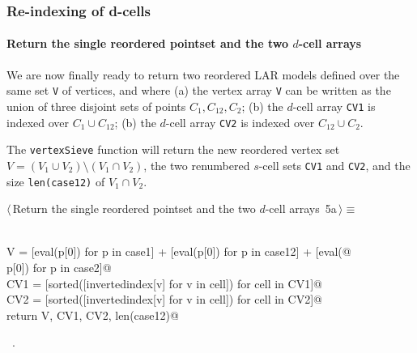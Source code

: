 \documentclass[11pt,oneside]{article}	%
\begin{document}
\subsubsection{Re-indexing of d-cells}

\paragraph{Return the single reordered pointset and the two $d$-cell arrays}
We are now finally ready to return two reordered LAR models defined over the same set \texttt{V} of vertices, and where (a) the vertex array \texttt{V} can be written as the union of three disjoint sets of points $C_1,C_{12},C_2$; (b) the $d$-cell array \texttt{CV1} is indexed over $C_1\cup C_{12}$; (b) the $d$-cell array \texttt{CV2} is indexed over $C_{12}\cup C_{2}$. 

The \texttt{vertexSieve} function will return the new reordered vertex set $V = (V_1 \cup V_2) \setminus (V_1 \cap V_2)$, the two renumbered $s$-cell sets \texttt{CV1} and \texttt{CV2}, and the size \texttt{len(case12)} of $V_1 \cap V_2$.
\begin{flushleft} \small \label{scrap7}
\protect{}$\langle\,$Return the single reordered pointset and the two $d$-cell arrays\nobreak\ {\footnotesize 5a}$\,\rangle\equiv$
\vspace{-1ex}
\begin{list}{}{} \item
\mbox{}\verb@@\\
\mbox{}\verb@   V = [eval(p[0]) for p in case1] + [eval(p[0]) for p in case12] + [eval(@\\
\mbox{}\verb@            p[0]) for p in case2]@\\
\mbox{}\verb@   CV1 = [sorted([invertedindex[v] for v in cell]) for cell in CV1]@\\
\mbox{}\verb@   CV2 = [sorted([invertedindex[v] for v in cell]) for cell in CV2]@\\
\mbox{}\verb@   return V, CV1, CV2, len(case12)@\\
\mbox{}\verb@@{\NWsep}
\end{list}
\vspace{-1ex}
\footnotesize\addtolength{\baselineskip}{-1ex}
\begin{list}{}{\setlength{\itemsep}{-\parsep}\setlength{\itemindent}{-\leftmargin}}
\item \NWtxtMacroRefIn\ .
\end{list}
\end{flushleft}
\end{document}
